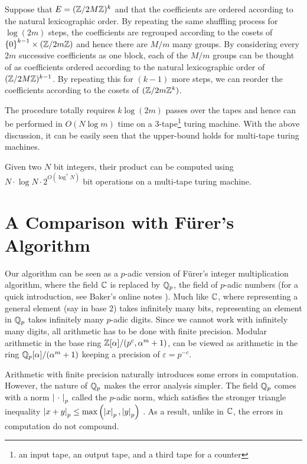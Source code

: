 \documentclass[11pt]{article}
\begin{document}
Suppose that $E = (\mathbb{Z}/2M\mathbb{Z})^k$ and that the coefficients are ordered
according to the natural lexicographic order. By repeating the same
shuffling process for $\log(2m)$ steps, the coefficients are regrouped
according to the cosets of $\left\{0\right\}^{k-1} \times (\mathbb{Z}/2m\mathbb{Z})$ and
hence there are $M/m$ many groups. By considering every $2m$
successive coefficients as one block, each of the $M/m$ groups can
be thought of as coefficients ordered according to the natural
lexicographic order of $(\mathbb{Z}/2M\mathbb{Z})^{k-1}$. By repeating this for
$(k-1)$ more steps, we can reorder the coefficients according to the
cosets of $(\mathbb{Z}/2m\mathbb{Z}^k)$.

The procedure totally requires $k\log(2m)$ passes over the tapes and
hence can be performed in $O(N\log m)$ time on a $3$-tape\footnote{an
  input tape, an output tape, and a third tape for a counter} turing
machine. With the above discussion, it can be easily seen that the
upper-bound holds for multi-tape turing machines.

\begin{theorem}
Given two $N$ bit integers, their product can be computed using
$N\cdot \log N\cdot 2^{O(\log^*N)}$ bit operations on a multi-tape turing machine.
\end{theorem}


\section{A Comparison with F\"{u}rer's Algorithm} \label{Qp_section}

Our algorithm can be seen as a $p$-adic version of F\"{u}rer's integer
multiplication algorithm, where the field $\mathbb{C}$ is replaced by $\mathbb{Q}_p$,
the field of $p$-adic numbers (for a quick introduction, see Baker's
online notes \cite{Baker}). Much like $\mathbb{C}$, where representing a
general element (say in base $2$) takes infinitely many bits,
representing an element in $\mathbb{Q}_p$ takes infinitely many $p$-adic
digits. Since we cannot work with infinitely many digits, all
arithmetic has to be done with finite precision. Modular arithmetic in
the base ring $\mathbb{Z}[\alpha]/(p^c, \alpha^m + 1)$, can be viewed as
arithmetic in the ring $\mathbb{Q}_p[\alpha]/(\alpha^m + 1)$ keeping a
precision of $\varepsilon = p^{-c}$.

Arithmetic with finite precision naturally introduces some errors in
computation. However, the nature of $\mathbb{Q}_p$ makes the error analysis
simpler. The field $\mathbb{Q}_p$ comes with a norm $\left|\ \cdot\ \right|_p$ called
the $p$-adic norm, which satisfies the stronger triangle inequality
$\left|x+y\right|_p \leq \max\left(\left|x\right|_p, \left|y\right|_p\right)$ \cite[Proposition
  2.6]{Baker}. As a result, unlike in $\mathbb{C}$, the errors in computation
do not compound.\\
\end{document}
